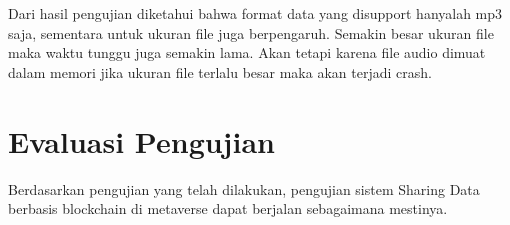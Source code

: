 Dari hasil pengujian diketahui bahwa format data yang disupport hanyalah mp3 saja, sementara untuk ukuran file juga berpengaruh.
Semakin besar ukuran file maka waktu tunggu juga semakin lama. Akan tetapi karena file audio dimuat dalam memori jika ukuran file terlalu besar maka
akan terjadi crash.

\section{Evaluasi Pengujian}
Berdasarkan pengujian yang telah dilakukan, pengujian sistem Sharing Data berbasis blockchain di metaverse dapat berjalan sebagaimana mestinya.


